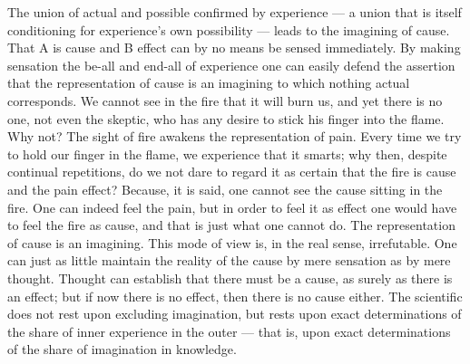 \documentclass[12pt]{book}
\begin{document}
The union of actual and possible confirmed by experience --- a union that is
itself conditioning for experience's own possibility --- leads to the imagining
of cause. That A is cause and B effect can by no means be sensed immediately.
By making sensation the be-all and end-all of experience one can easily defend
the assertion that the representation of cause is an imagining to which nothing
actual corresponds. We cannot see in the fire that it will burn us, and yet
there is no one, not even the skeptic, who has any desire to stick his finger
into the flame. Why not? The sight of fire awakens the representation of pain.
Every time we try to hold our finger in the flame, we experience that it
smarts; why then, despite continual repetitions, do we not dare to regard it
as certain that the fire is cause and the pain effect? Because, it is said, one
cannot see the cause sitting in the fire. One can indeed feel the pain, but in
order to feel it as effect one would have to feel the fire as cause, and that
is just what one cannot do. The representation of cause is an imagining. This
mode of view is, in the real sense, irrefutable. One can just as little
maintain the reality of the cause by mere sensation as by mere thought.
Thought can establish that there must be a cause, as surely as there is an
effect; but if now there is no effect, then there is no cause either. The
scientific does not rest upon excluding imagination, but rests upon exact
determinations of the share of inner experience in the outer --- that is, upon
exact determinations of the share of imagination in knowledge.
\end{document}
